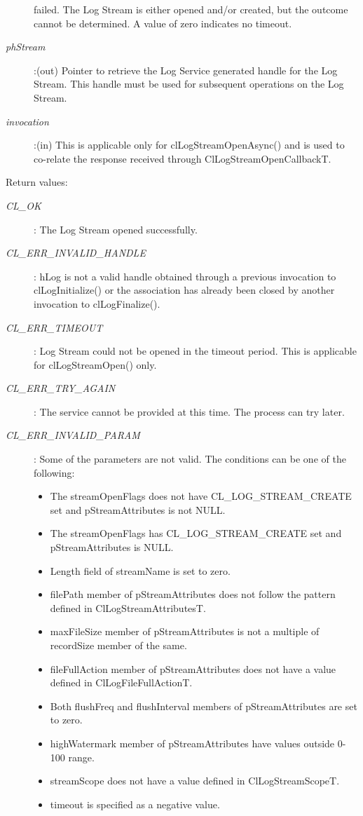 \begin{flushleft}
\begin{Desc}
\begin{description}
failed. The Log Stream is either opened and/or created, but the outcome cannot be determined. A value of zero indicates no timeout.
\item[{\em phStream}]:(out) Pointer to retrieve the Log Service generated handle for the Log Stream. This handle must be used for subsequent operations on 
the Log Stream.
\item[{\em invocation}]:(in) This is applicable only for clLogStreamOpenAsync() and is used to co-relate the response received through 
ClLogStreamOpenCallbackT.
\end{description}
\end{Desc}
\begin{Desc}
\item[Return values:]
\begin{description}
\item[{\em CL\_\-OK}]: The Log Stream opened successfully.
\item[{\em CL\_\-ERR\_\-INVALID\_\-HANDLE}]: hLog is not a valid handle obtained through a previous invocation to 
clLogInitialize() or the association has already been closed by another invocation to clLogFinalize().
\item[{\em CL\_\-ERR\_\-TIMEOUT}]: Log Stream could not be opened in the timeout period. This is applicable for clLogStreamOpen() only.
\item[{\em CL\_\-ERR\_\-TRY\_\-AGAIN}]: The service cannot be provided at this time. The process can try later.
\item[{\em CL\_\-ERR\_\-INVALID\_\-PARAM}]: Some of the parameters are not valid. The conditions can be one of the following:
\begin{itemize}
\item
The streamOpenFlags does not have CL\_\-LOG\_\-STREAM\_\-CREATE set and pStreamAttributes is not NULL.
\item
The streamOpenFlags has CL\_\-LOG\_\-STREAM\_\-CREATE set and pStreamAttributes is NULL.
\item
Length field of streamName is set to zero.
\item
filePath member of pStreamAttributes does not follow the pattern defined in ClLogStreamAttributesT.
\item
maxFileSize member of pStreamAttributes is not a multiple of recordSize member of the same.
\item
fileFullAction member of pStreamAttributes does not have a value defined in ClLogFileFullActionT.
\item
Both flushFreq and flushInterval members of pStreamAttributes are set to zero.
\item
highWatermark member of pStreamAttributes have values outside 0-100 range.
\item
streamScope does not have a value defined in ClLogStreamScopeT.
\item
timeout is specified as a negative value.
\end{itemize}


\end{description}
\end{Desc}
\end{flushleft}
